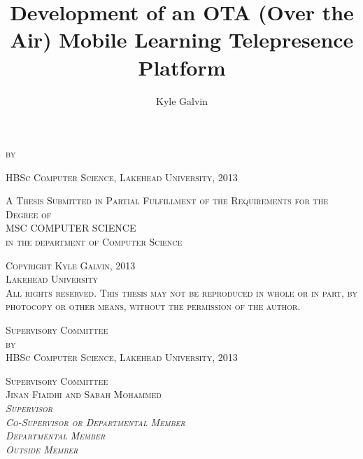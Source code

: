 \documentclass[a4paper,12pt]{report}
\begin{document}
\begin{titlepage}
	\begin{center}
	\title{\Large Development of an OTA (Over the Air) Mobile Learning Telepresence Platform}
	\thetitle{\\}
	\textsc{\normalsize by\\}
	\author{\normalsize Kyle Galvin}
	\theauthor{\\}
	\normalsize\textsc{HBSc Computer Science, Lakehead University, 2013\\[0.5cm]}
	
	\textsc{A Thesis Submitted in Partial Fulfillment of the Requirements for the Degree of\\[0.5cm]}
	\textsc{MSC COMPUTER SCIENCE\\}
	\textsc{in the department of Computer Science\\[11.5cm]}




	\textsc{Copyright Kyle Galvin, 2013\\}
	\textsc{Lakehead University\\[0.5cm]}
	\textsc{All rights reserved. This thesis may not be reproduced in whole or in part, by photocopy or other means, without the permission of the author.}
	\end{center}
\end{titlepage}
\newpage
	\begin{center}
		\textsc{\LARGE Supervisory Committee\\[2cm]}
		\thetitle{\\}
		\textsc{\normalsize by\\}
		\theauthor{\\}
		\normalsize\textsc{HBSc Computer Science, Lakehead University, 2013\\[10cm]}
	\end{center}
	\textsc{\Large Supervisory Committee\\[0.5cm]}
	\textsc{Jinan Fiaidhi and Sabah Mohammed\\}
	\textsc{\emph{Supervisor}\\}
	\textsc{\emph{Co-Supervisor or Departmental Member}\\}
	\textsc{\emph{Departmental Member}\\}
	\textsc{\emph{Outside Member}\\}
\newpage

\tableofcontents
\end{document}
